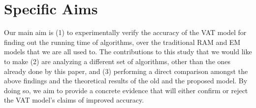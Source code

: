 \section{Specific Aims}

Our main aim is (1) to experimentally verify the accuracy of the VAT model for 
finding out the running time of algorithms, over the traditional RAM and EM
models that we are all used to. The contributions to this study that we would
like to make (2) are analyzing a different set of algorithms, other than the
ones already done by this paper, and (3) performing a direct comparison amongst
the above findings and the theoretical results of the old and the proposed
model. By doing so, we aim to provide a concrete evidence that will either
confirm or reject the VAT model's claims of improved accuracy.